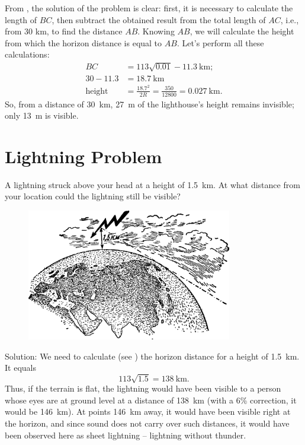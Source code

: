 \ans From , the solution of the problem is clear: first, it is necessary to calculate the length of $BC$, then subtract the obtained result from the total length of $AC$, i.e., from 30 km, to find the distance $AB$. Knowing $AB$, we will calculate the height from which the horizon distance is equal to $AB$. Let's perform all these calculations:
\begin{align*}%
BC & = 113\sqrt{0.01} - \SI{11.3}{\kilo\meter};\\
30 - 11.3 & = \SI{18.7}{\kilo\meter}\\
\text{height} & = \frac{18.7^{2}}{2R} = \frac{350}{12800} = \SI{0.027}{\kilo\meter}.
\end{align*}
So, from a distance of \SI{30}{\kilo\meter}, \SI{27}{\meter} of the lighthouse's height remains invisible; only \SI{13}{\meter} is visible. 

\section{Lightning Problem}
\label{sec-6.8}

\ques A lightning struck above your head at a height of \SI{1.5}{\kilo\meter}. At what distance from your location could the lightning still be visible?

\begin{figure}[h!]
\centering
\includegraphics[width=0.8\textwidth]{figures/ch-06/fig-106.pdf}
\end{figure}



Solution: We need to calculate (see ) the horizon distance for a height of \SI{1.5}{\kilo\meter}. It equals 
\begin{equation*}%
113\sqrt{1.5} = \SI{138}{\kilo\meter}. 
\end{equation*}
Thus, if the terrain is flat, the lightning would have been visible to a person whose eyes are at ground level at a distance of \SI{138}{\kilo\meter} (with a 6\% correction, it would be \SI{146}{\kilo\meter}). At points \SI{146}{\kilo\meter} away, it would have been visible right at the horizon, and since sound does not carry over such distances, it would have been observed here as sheet lightning -- lightning without thunder.


